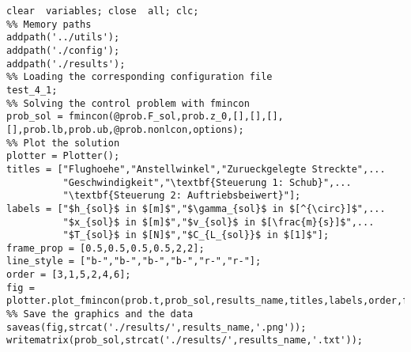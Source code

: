 \begin{lstlisting}[style=num_octave, caption={Matlab Programmcode von \texttt{main.m}.}, label=code:direct_main]
clear  variables; close  all; clc;
%% Memory paths
addpath('../utils');
addpath('./config');
addpath('./results');
%% Loading the corresponding configuration file
test_4_1;
%% Solving the control problem with fmincon
prob_sol = fmincon(@prob.F_sol,prob.z_0,[],[],[],[],prob.lb,prob.ub,@prob.nonlcon,options);
%% Plot the solution
plotter = Plotter();
titles = ["Flughoehe","Anstellwinkel","Zurueckgelegte Streckte",...
          "Geschwindigkeit","\textbf{Steuerung 1: Schub}",...
          "\textbf{Steuerung 2: Auftriebsbeiwert}"];
labels = ["$h_{sol}$ in $[m]$","$\gamma_{sol}$ in $[^{\circ}]$",...
          "$x_{sol}$ in $[m]$","$v_{sol}$ in $[\frac{m}{s}]$",...
          "$T_{sol}$ in $[N]$","$C_{L_{sol}}$ in $[1]$"];
frame_prop = [0.5,0.5,0.5,0.5,2,2];
line_style = ["b-","b-","b-","b-","r-","r-"];
order = [3,1,5,2,4,6];
fig = plotter.plot_fmincon(prob.t,prob_sol,results_name,titles,labels,order,frame_prop,line_style);
%% Save the graphics and the data
saveas(fig,strcat('./results/',results_name,'.png'));
writematrix(prob_sol,strcat('./results/',results_name,'.txt'));
\end{lstlisting}







